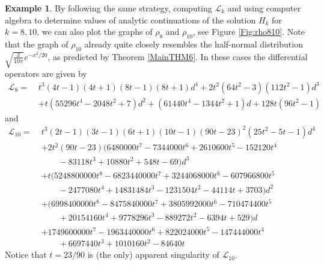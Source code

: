 \documentclass[12pt,reqno]{amsart}
\theoremstyle{definition}
\theoremstyle{plain}
\theoremstyle{definition}
\newtheorem{example}[theorem]{Example}
\begin{document}
\begin{example}
By following the same strategy, computing $\mathcal L_k$ and using computer algebra to determine values of analytic continuations of the solution $H_k$ for $k=8, 10$, we can also plot the graphs of $\rho_8$ and $\rho_{10}$, see Figure \ref{Fig:rho810}. Note that the graph of $\rho_{10}$ already quite closely resembles the half-normal distribution $\sqrt{\frac{2}{10 \pi}} e^{-x^2/20}$, as predicted by Theorem \ref{MainTHM6}. In these cases the differential operators are given by 
\begin{align*} \mathcal L_8 =\;& t^3(4t-1)(4t+1)(8t-1)(8t+1)d^4 + 2t^2(64t^2-3)(112t^2-1)d^3 \\ &+ t(55296t^4 - 2048t^2 + 7)d^2 + (61440t^4 - 1344t^2 + 1)d + 128t (96t^2-1) \end{align*}
and
\begin{align*}
	\mathcal{L}_{10} =\;& 
	t^3 (2t - 1)(3t - 1)(6t + 1)(10t - 1)(90t - 23)^2 (25t^2 - 5t - 1) d^4 \\
	&+ 2t^2 (90t - 23) 
	(6480000t^7 - 7344000t^6 + 2610600t^5 - 152120t^4 \\
	&\quad\quad - 83118t^3 + 10880t^2 + 548t - 69) d^3 \\
	&+ t (5248800000t^8 - 6823440000t^7 + 3244068000t^6 - 607966800t^5 \\
	&\quad\quad - 2477080t^4 + 14831484t^3 - 1231504t^2 - 44114t + 3703) d^2 \\
	&+ (6998400000t^8 - 8475840000t^7 + 3805992000t^6 - 710474400t^5 \\
	&\quad\quad + 20154160t^4 + 9778296t^3 - 889272t^2 - 6394t + 529) d \\
	&+ 1749600000t^7 - 1963440000t^6 + 822024000t^5 - 147444000t^4 \\
	&\quad\quad + 6697440t^3 + 1010160t^2 - 84640t
\end{align*}
Notice that $t=23/90$ is (the only) apparent singularity of $
\mathcal L_{10}$. 
\end{example}
\end{document}
